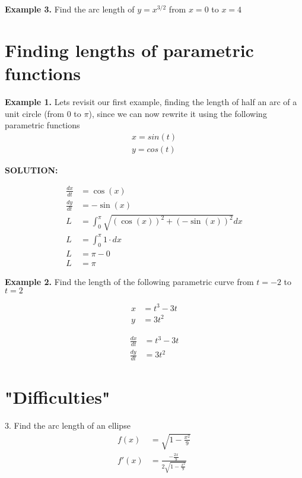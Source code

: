 \documentclass[10pt]{extarticle}
\begin{document}
\textbf{Example 3.} Find the arc length of $y = x^{3/2} $ from $x = 0$ to $x= 4$ 

\vspace{8cm}

\section{Finding lengths of parametric functions}

\textbf{Example 1.} Lets revisit our first example, finding the length of half an arc of a unit circle (from $0$ to $\pi$), since we can now rewrite it using the following parametric functions
\begin{align} 
    x = sin(t) \\ 
    y = cos(t) 
\end{align}

\textbf{SOLUTION: }

\begin{align}
    \frac{dx}{dt} &= \cos(x) \\ 
    \frac{dy}{dt} &= -\sin(x) \\
    L &= \int_{0}^{\pi} \sqrt{(\cos(x))^2 + (-\sin(x))^2} dx \\
    L &= \int_{0}^{\pi} 1 \cdot dx \\ 
    L &= \pi - 0 \\
    L &= \pi
\end{align}

\textbf{Example 2.} Find the length of the following parametric curve from $t = -2$ to $t = 2$

\begin{align} 
    x &= t^3 - 3t \\ 
    y &= 3t^2  
\end{align}


\begin{align} 
    \frac{dx}{dt} &= t^3 - 3t \\ 
    \frac{dy}{dt} &= 3t^2  
\end{align}

\section{"Difficulties"}
3. Find the arc length of an ellipse
\begin{align}
    f(x) &= \sqrt{1-\frac{x^2}{9}} \\
    f'(x) &= \frac{-\frac{2x}{9}}{2\sqrt{1-\frac{x^2}{9}}}
\end{align}

\begin{center}
\end{center}
\end{document}

